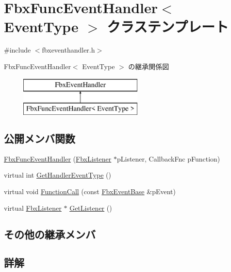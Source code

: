 \hypertarget{class_fbx_func_event_handler}{}\section{Fbx\+Func\+Event\+Handler$<$ Event\+Type $>$ クラステンプレート}
\label{class_fbx_func_event_handler}


{\ttfamily \#include $<$fbxeventhandler.\+h$>$}

Fbx\+Func\+Event\+Handler$<$ Event\+Type $>$ の継承関係図\begin{figure}[H]
\begin{center}
\leavevmode
\includegraphics[height=2.000000cm]{class_fbx_func_event_handler}
\end{center}
\end{figure}
\subsection*{公開メンバ関数}
\begin{DoxyCompactItemize}
\item 
\hyperlink{class_fbx_func_event_handler_adc9cefc0f250faf562bc0d8a83171548}{Fbx\+Func\+Event\+Handler} (\hyperlink{class_fbx_listener}{Fbx\+Listener} $\ast$p\+Listener, Callback\+Fnc p\+Function)
\item 
virtual int \hyperlink{class_fbx_func_event_handler_a0c1a0eaedda70615a684bd96aa72fb97}{Get\+Handler\+Event\+Type} ()
\item 
virtual void \hyperlink{class_fbx_func_event_handler_a6111e1a7e1a0e60170a2de498fe44766}{Function\+Call} (const \hyperlink{class_fbx_event_base}{Fbx\+Event\+Base} \&p\+Event)
\item 
virtual \hyperlink{class_fbx_listener}{Fbx\+Listener} $\ast$ \hyperlink{class_fbx_func_event_handler_af196b87b07e698704615056be5923745}{Get\+Listener} ()
\end{DoxyCompactItemize}
\subsection*{その他の継承メンバ}


\subsection{詳解}
